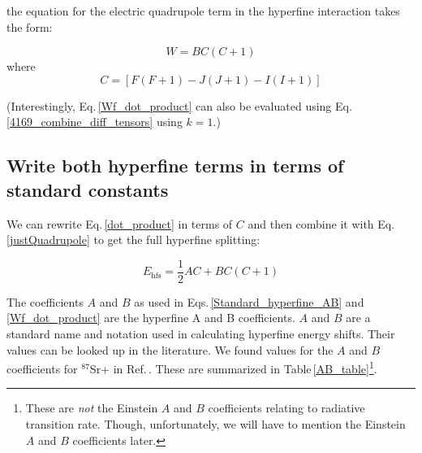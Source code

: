 the equation for the electric quadrupole term in the hyperfine interaction takes the form:

\begin{equation}\label{justQuadrupole}
W=BC(C+1)
\end{equation}
where 
\begin{equation}
C=[F(F+1)-J(J+1)-I(I+1)]
\end{equation}

(Interestingly, Eq.\,\ref{Wf_dot_product} can also be evaluated using Eq.\,\ref{4169_combine_diff_tensors} using $k=1$.)

\subsection{Write both hyperfine terms in terms of standard constants}
We can rewrite Eq.\,\ref{dot_product} in terms of $C$ 
and then combine it with Eq.\,\ref{justQuadrupole} to get the full hyperfine splitting\cite{cuaMITnotes}: 

\begin{equation}\label{Standard_hyperfine_AB}
E_{\mathrm{hfs}}=\frac{1}{2}AC+BC(C+1)
\end{equation}

The coefficients $A$ and $B$ as used in Eqs.\,\ref{Standard_hyperfine_AB} and \ref{Wf_dot_product} are the hyperfine A and B coefficients. $A$ and $B$ are a standard name and notation used in calculating hyperfine energy shifts. Their values can be looked up in the literature\cite{cuaMITnotes}.  We found values for the $A$ and $B$ coefficients for $^{87}$Sr+ in Ref.\,\cite{safronova2photon}. These are summarized in Table\,\ref{AB_table}\footnote{These are \emph{not} the Einstein $A$ and $B$ coefficients relating to radiative transition rate. Though, unfortunately, we will have to mention the Einstein $A$ and $B$ coefficients later.}.  

